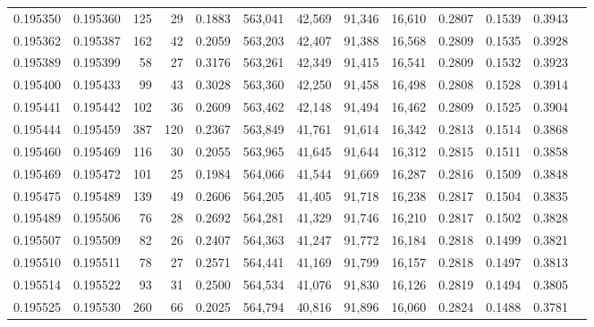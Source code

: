 \begin{tabular}{rrrrrrrrrrrrr}
0.195350 & 0.195360 &   125 &  29 &                                     0.1883 & 563,041 &  42,569 &  91,346 &  16,610 & 0.2807 & 0.1539 & 0.3943 \\
0.195362 & 0.195387 &   162 &  42 &                                     0.2059 & 563,203 &  42,407 &  91,388 &  16,568 & 0.2809 & 0.1535 & 0.3928 \\
0.195389 & 0.195399 &    58 &  27 &                                     0.3176 & 563,261 &  42,349 &  91,415 &  16,541 & 0.2809 & 0.1532 & 0.3923 \\
0.195400 & 0.195433 &    99 &  43 &                                     0.3028 & 563,360 &  42,250 &  91,458 &  16,498 & 0.2808 & 0.1528 & 0.3914 \\
0.195441 & 0.195442 &   102 &  36 &                                     0.2609 & 563,462 &  42,148 &  91,494 &  16,462 & 0.2809 & 0.1525 & 0.3904 \\
0.195444 & 0.195459 &   387 & 120 &                                     0.2367 & 563,849 &  41,761 &  91,614 &  16,342 & 0.2813 & 0.1514 & 0.3868 \\
0.195460 & 0.195469 &   116 &  30 &                                     0.2055 & 563,965 &  41,645 &  91,644 &  16,312 & 0.2815 & 0.1511 & 0.3858 \\
0.195469 & 0.195472 &   101 &  25 &                                     0.1984 & 564,066 &  41,544 &  91,669 &  16,287 & 0.2816 & 0.1509 & 0.3848 \\
0.195475 & 0.195489 &   139 &  49 &                                     0.2606 & 564,205 &  41,405 &  91,718 &  16,238 & 0.2817 & 0.1504 & 0.3835 \\
0.195489 & 0.195506 &    76 &  28 &                                     0.2692 & 564,281 &  41,329 &  91,746 &  16,210 & 0.2817 & 0.1502 & 0.3828 \\
0.195507 & 0.195509 &    82 &  26 &                                     0.2407 & 564,363 &  41,247 &  91,772 &  16,184 & 0.2818 & 0.1499 & 0.3821 \\
0.195510 & 0.195511 &    78 &  27 &                                     0.2571 & 564,441 &  41,169 &  91,799 &  16,157 & 0.2818 & 0.1497 & 0.3813 \\
0.195514 & 0.195522 &    93 &  31 &                                     0.2500 & 564,534 &  41,076 &  91,830 &  16,126 & 0.2819 & 0.1494 & 0.3805 \\
0.195525 & 0.195530 &   260 &  66 &                                     0.2025 & 564,794 &  40,816 &  91,896 &  16,060 & 0.2824 & 0.1488 & 0.3781 \\

\end{tabular}
